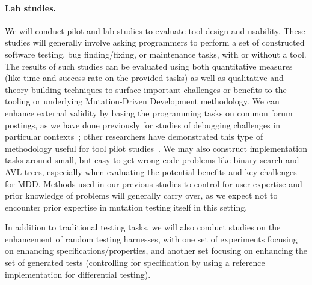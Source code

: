 \paragraph{Lab studies.}
We will conduct pilot and lab studies to evaluate tool design
and usability.
These studies will generally involve asking programmers to perform a set of
constructed software testing, bug finding/fixing, or maintenance tasks, with or
without a tool.  The results of such studies can be evaluated using both
quantitative measures (like time and success rate on the provided tasks) as well
as qualitative and theory-building techniques to surface
important challenges or benefits to the tooling or underlying Mutation-Driven
Development methodology.  We can enhance external validity by basing the
programming tasks on common forum postings, as we have done previously for
studies of debugging challenges in particular
contexts~\cite{frameworkDebugging}; other researchers have demonstrated this
type of methodology useful for tool pilot studies~\cite{sunshineDocumentation}.
We may also construct implementation tasks around small, but easy-to-get-wrong
code problems like binary search and AVL trees, especially when evaluating the
potential benefits and key challenges for MDD.  Methods used in our
previous studies to control for user expertise and prior knowledge of
problems will generally carry over, as we expect not to encounter
prior expertise in mutation testing itself in this setting.

In addition to traditional testing tasks, we will also conduct studies
on the enhancement of random testing harnesses, with one set of
experiments focusing on enhancing specifications/properties, and
another set focusing on enhancing the set of generated tests
(controlling for specification by using a reference implementation for
differential testing).

